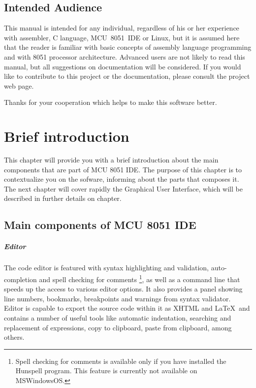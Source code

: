 \documentclass[a4paper,twoside,12pt]{book}
\begin{document}
	\section*{Intended Audience}
		This manual is intended for any individual, regardless of his or her experience with assembler, C language, MCU~8051~IDE or Linux, but it is assumed here that the reader is familiar with basic concepts of assembly language programming and with 8051 processor architecture.
		Advanced users are not likely to read this manual, but all suggestions on documentation will be considered. If you would like to contribute to this project or the documentation, please consult the project web page.


		Thanks for your cooperation which helps to make this software better.

\chapter{Brief introduction}

	This chapter will provide you with a brief introduction about the main components that are part of MCU 8051 IDE. The purpose of this chapter is to contextualize you on the sofware, informing about the parts that composes it. The next chapter will cover rapidly the Graphical User Interface, which will be described in further details on chapter.

	\section{Main components of MCU 8051 IDE}
		\paragraph{Editor} The code editor is featured with syntax highlighting and validation, auto-completion and spell checking for comments \footnote{Spell checking for comments is available only if you have installed the Hunspell program. This feature is currently not available on MS\textregistered Windows\textregistered OS.}, as well as a command line that speeds up the access to various editor options. It also provides a panel showing line numbers, bookmarks, breakpoints and warnings from syntax validator. Editor is capable to export the source code within it as XHTML and \LaTeX\ and contains a number of useful tools like automatic indentation, searching and replacement of expressions, copy to clipboard, paste from clipboard, among others.
\end{document}
